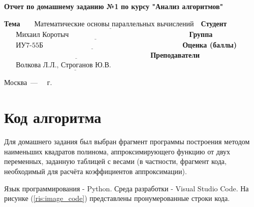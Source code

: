 \documentclass[12pt]{report}
\begin{document}
\begin{titlepage}
		
		\begin{center}
			\Large\textbf{Отчет по домашнему заданию №1}\newline
			\Large\textbf{по курсу "Анализ алгоритмов"}\newline
		\end{center}
	
		\noindent\textbf{Тема} $\underline{\text{~~~~~Математические основы параллельных вычислений~~}}$\newline\newline\newline
		\noindent\textbf{Студент} $\underline{\text{~~~~~Михаил Коротыч~~~~~~~~~~~~~~~~~~~~~~~~~~~~~~~~~~~~~~~~~~~~~~~~~~}}$\newline\newline
		\noindent\textbf{Группа} $\underline{\text{~~~~~ИУ7-55Б~~~~~~~~~~~~~~~~~~~~~~~~~~~~~~~~~~~~~~~~~~~~~~~~~~~~~~~~~~}}$\newline\newline
		\noindent\textbf{Оценка (баллы)} $\underline{\text{~~~~~~~~~~~~~~~~~~~~~~~~~~~~~~~~~~~~~~~~~~~~~~~~~~~~~~~~~~~~~}}$\newline\newline
		\noindent\textbf{Преподаватели} $\underline{\text{~~~~~Волкова Л.Л., Строганов Ю.В.~~~~~~~~~~~~~~~}}$\newline
		
		\begin{center}
			\vfill
			Москва~---~\the\year
			~г.
		\end{center}
	\restoregeometry
	\end{titlepage}
	
\tableofcontents
\newpage
\chapter{Код алгоритма}
Для домашнего задания был выбран фрагмент программы построения методом наименьших квадратов полинома, аппроксимирующего функцию от двух переменных, заданную таблицей с весами (в частности, фрагмент кода, необходимый для расчёта коэффициентов аппроксимации).

Язык программирования - Python. Среда разработки - Visual Studio Code.
На рисунке (\ref{ris:image_code}) представлены пронумерованные строки кода.
\end{document}
